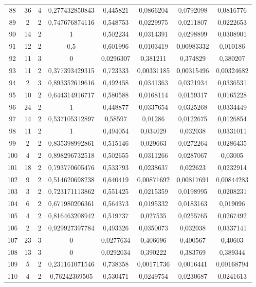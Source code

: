 \begin{longtable}{|c|c|c|c|c|c|c|c|}
88 & 36 & 4 & 0,277432850843 & 0,445821 & 0,0866204 & 0,0792098 & 0,0816776  \\
89 & 2 & 2 & 0,747676874116 & 0,548753 & 0,0229975 & 0,0211807 & 0,0222653  \\
90 & 14 & 2 & 1 & 0,502234 & 0,0314391 & 0,0298899 & 0,0308901  \\
91 & 12 & 2 & 0,5 & 0,601996 & 0,0103419 & 0,00983332 & 0,010186  \\
92 & 11 & 3 & 0 & 0,0296307 & 0,381211 & 0,374829 & 0,380207  \\
93 & 11 & 2 & 0,377393429315 & 0,723333 & 0,00331185 & 0,00315496 & 0,00324682  \\
94 & 2 & 3 & 0,893352619616 & 0,492458 & 0,0341363 & 0,0321934 & 0,0336531  \\
95 & 10 & 2 & 0,644314916717 & 0,580588 & 0,0168114 & 0,0159317 & 0,0165228  \\
96 & 24 & 2 & 1 & 0,448877 & 0,0337654 & 0,0325268 & 0,0334449  \\
97 & 14 & 2 & 0,537105312897 & 0,58597 & 0,01286 & 0,0122675 & 0,0126854  \\
98 & 11 & 2 & 1 & 0,494054 & 0,034029 & 0,032038 & 0,0331011  \\
99 & 2 & 2 & 0,835398992861 & 0,515146 & 0,029663 & 0,0272264 & 0,0286435  \\
100 & 4 & 2 & 0,898296732518 & 0,502655 & 0,0311266 & 0,0287067 & 0,03005  \\
101 & 18 & 2 & 0,793770605476 & 0,533793 & 0,0238637 & 0,022623 & 0,0232914  \\
102 & 9 & 2 & 0,514620698238 & 0,640419 & 0,00871692 & 0,00817691 & 0,00844283  \\
103 & 3 & 2 & 0,723171113862 & 0,551425 & 0,0215359 & 0,0198995 & 0,0208231  \\
104 & 6 & 2 & 0,671980206361 & 0,564373 & 0,0195332 & 0,0183163 & 0,019096  \\
105 & 4 & 2 & 0,816463208942 & 0,519737 & 0,027535 & 0,0255765 & 0,0267492  \\
106 & 2 & 2 & 0,929927397784 & 0,493326 & 0,0350073 & 0,032038 & 0,0337141  \\
107 & 23 & 3 & 0 & 0,0277634 & 0,406696 & 0,400567 & 0,40603  \\
108 & 13 & 3 & 0 & 0,0292034 & 0,390222 & 0,383769 & 0,389344  \\
109 & 5 & 2 & 0,231161071546 & 0,738358 & 0,00171736 & 0,0016441 & 0,00168794  \\
110 & 4 & 2 & 0,76242369505 & 0,530471 & 0,0249754 & 0,0230687 & 0,0241613  \\

\end{longtable}
